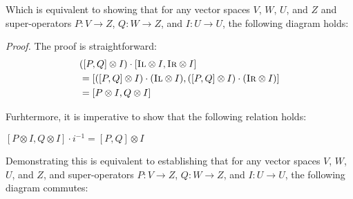 Which is equivalent to showing that for any vector spaces $V$, $W$, $U$, and $Z$  and super-operators $P: V \xrightarrow{} Z$, $Q: W \xrightarrow{} Z$, and $I: U \xrightarrow{} U$, the following diagram holds:

\vspace{10pt}




\vspace{10pt}

\textit{Proof.} \quad The proof is straightforward:
\begin{equation}
\begin{split}
    & ( [P,Q] \otimes I) \cdot  [\textsc{Il} \otimes I, \textsc{Ir} \otimes I ]  \\
    &=  [([P,Q] \otimes I) \cdot (\textsc{Il} \otimes I),([P,Q] \otimes I) \cdot (\textsc{Ir} \otimes I) ]\\
    &=  [P \otimes I, Q \otimes I]
\end{split}
\end{equation}

\vspace{15pt}

Furhtermore, it is imperative to show that the following relation holds:

\begin{lemma}\label{lemi-1}
  $ [P \otimes I, Q \otimes I] \cdot  i^{-1}  = [P,Q] \otimes I$
\end{lemma}

Demonstrating this is equivalent to establishing that for any vector spaces $V$, $W$, $U$, and $Z$, and super-operators $P: V \xrightarrow{} Z$, $Q: W \xrightarrow{} Z$, and $I: U \xrightarrow{} U$, the following diagram commutes:

\vspace{10pt}



